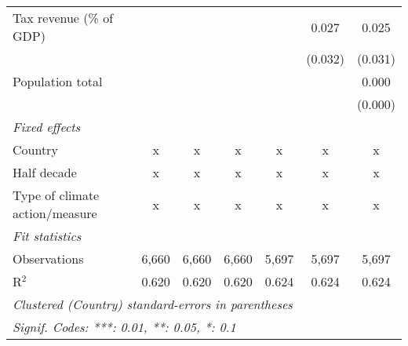 \begin{tabular}{lcccccc}
   Tax revenue (\% of GDP)                                                          &               &               &               &         & 0.027   & 0.025\\   
                                                                                    &               &               &               &         & (0.032) & (0.031)\\   
   Population total                                                                 &               &               &               &         &         & 0.000\\   
                                                                                    &               &               &               &         &         & (0.000)\\   
   \emph{Fixed effects}\\
   Country                                                                          & x             & x             & x             & x       & x       & x\\  
   Half decade                                                                      & x             & x             & x             & x       & x       & x\\  
   Type of climate action/measure                                                   & x             & x             & x             & x       & x       & x\\  
   \midrule \emph{Fit statistics}\\
   Observations                                                                     & 6,660         & 6,660         & 6,660         & 5,697   & 5,697   & 5,697\\  
   R$^2$                                                                            & 0.620         & 0.620         & 0.620         & 0.624   & 0.624   & 0.624\\  
   \midrule
   \multicolumn{7}{l}{\emph{Clustered (Country) standard-errors in parentheses}}\\
   \multicolumn{7}{l}{\emph{Signif. Codes: ***: 0.01, **: 0.05, *: 0.1}}\\
\end{tabular}
\par\endgroup


